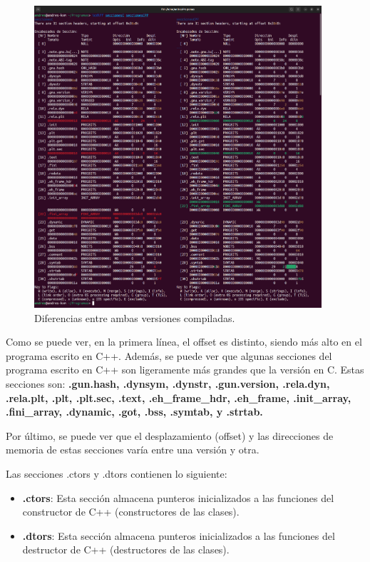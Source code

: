 \documentclass{article}
\begin{document}
\begin{figure}[H]
    \centering
    \includegraphics[width=0.95\textwidth]{imagenes/icdiff/mergedicdiff.png}
    \caption{Diferencias entre ambas versiones compiladas.}
\end{figure}

Como se puede ver, en la primera línea, el offset es distinto, siendo más alto en el programa escrito en C++. Además, se puede ver que algunas secciones del programa escrito en C++ son ligeramente más grandes que la versión en C. Estas secciones son: \textbf{.gun.hash, .dynsym, .dynstr, .gun.version, .rela.dyn, .rela.plt, .plt, .plt.sec, .text, .eh\_frame\_hdr, .eh\_frame, .init\_array, .fini\_array, .dynamic, .got, .bss, .symtab, y .strtab.}

\bigskip

Por último, se puede ver que el desplazamiento (offset) y las direcciones de memoria de estas secciones varía entre una versión y otra.


\bigskip

Las secciones .ctors y .dtors contienen lo siguiente:

\begin{itemize}
    \item \textbf{.ctors}: Esta sección almacena punteros inicializados a las funciones del constructor de C++ (constructores de las clases).
    \item \textbf{.dtors}: Esta sección almacena punteros inicializados a las funciones del destructor de C++ (destructores de las clases).
\end{itemize}
\end{document}
